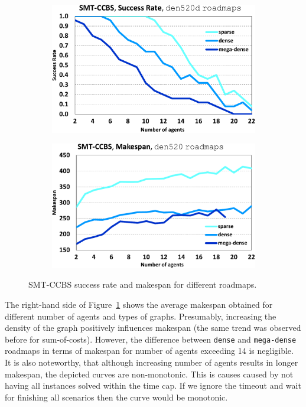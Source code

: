\documentclass[review]{elsarticle}
\newcommand\konstantin[1]{\nb{\textbf{Konstantin:}}{red}{#1}}
\newcommand\pavel[1]{\nb{\textbf{Pavel:}}{blue}{#1}}
\newcommand{\smtccbs}{SMT-CCBS\xspace}
\begin{document}
\begin{figure}
\centering
    \centering
    
    \begin{subfigure}
        \centering
        \includegraphics[width=0.45\linewidth]{mapfr-sr-plot-smtcbs-den520d_roadmaps.pdf}
    \end{subfigure}\hspace{0.025\linewidth}
    \begin{subfigure}
        \centering
        \includegraphics[width=0.45\linewidth]{mapfr-Makespan-plot-smtcbs-den520d_roadmaps.pdf}
    \end{subfigure}%
    
    \caption{\smtccbs success rate and makespan for different roadmaps.}
    \label{fig:results-smtccbs-SR-Makespan-roadmaps}
\end{figure}


The right-hand side of Figure~\ref{fig:results-smtccbs-SR-Makespan-roadmaps} shows the average makespan obtained for different number of agents and types of graphs. Presumably, increasing the density of the graph positively influences makespan (the same trend was observed before for sum-of-costs). However, the difference between \texttt{dense} and \texttt{mega-dense} roadmaps in terms of makespan for number of agents exceeding 14 is negligible. It is also noteworthy, that although increasing number of agents results in longer makespan, the depicted curves are non-monotonic. This is causes caused by not having all instances solved within the time cap. If we ignore the timeout and wait for finishing all scenarios then the curve would be monotonic.
\end{document}
